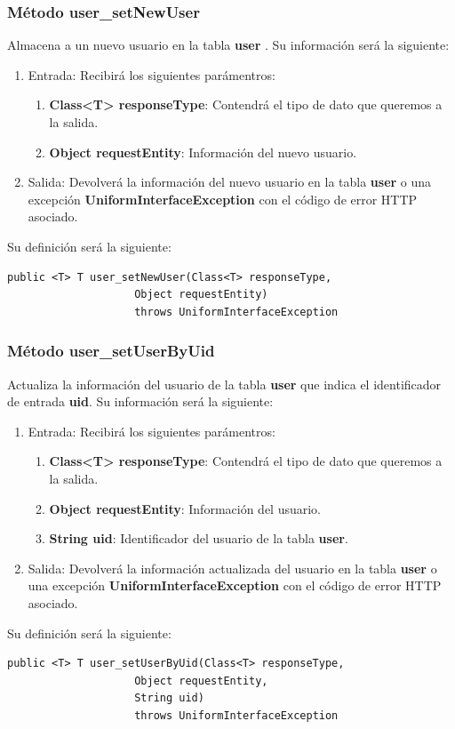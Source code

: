 \subsubsection{Método user\_setNewUser}
Almacena a un nuevo usuario en la tabla \textbf{user} . Su información será la siguiente:
\begin{enumerate}
\item Entrada: Recibirá los siguientes parámentros:
\begin{enumerate}
\item \textbf{Class<T> responseType}: Contendrá el tipo de dato que queremos a la salida. 
\item \textbf{Object requestEntity}: Información del nuevo usuario.
\end{enumerate}
\item Salida: Devolverá la información del nuevo usuario en la tabla \textbf{user} o una excepción \textbf{UniformInterfaceException} con el código de error HTTP asociado.
\end{enumerate}
\bigskip
\par
Su definición será la siguiente:
\begin{verbatim}public <T> T user_setNewUser(Class<T> responseType, 
					Object requestEntity) 
					throws UniformInterfaceException\end{verbatim}

\subsubsection{Método user\_setUserByUid}
Actualiza la información del usuario de la tabla \textbf{user} que indica el identificador de entrada \textbf{uid}. Su información será la siguiente:
\begin{enumerate}
\item Entrada: Recibirá los siguientes parámentros:
\begin{enumerate}
\item \textbf{Class<T> responseType}: Contendrá el tipo de dato que queremos a la salida. 
\item \textbf{Object requestEntity}: Información del usuario.
\item \textbf{String uid}: Identificador del usuario de la tabla \textbf{user}.
\end{enumerate}
\item Salida: Devolverá la información actualizada del usuario en la tabla \textbf{user} o una excepción \textbf{UniformInterfaceException} con el código de error HTTP asociado.
\end{enumerate}
\bigskip
\par
Su definición será la siguiente:
\begin{verbatim}public <T> T user_setUserByUid(Class<T> responseType, 
					Object requestEntity, 
					String uid) 
					throws UniformInterfaceException\end{verbatim}

